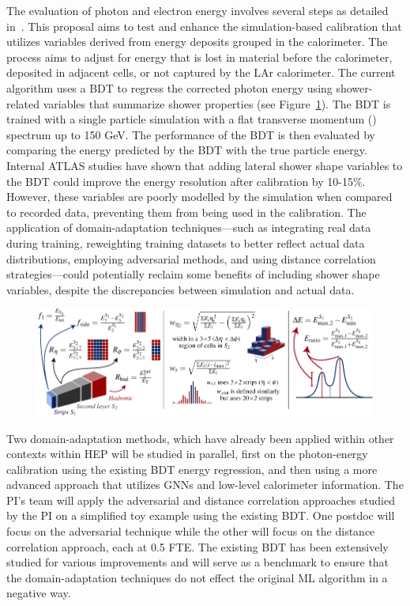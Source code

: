 \documentclass[letter, USenglish, 11pt, subfigure]{article}
\begin{document}
The evaluation of photon and electron energy involves several steps as detailed in~\cite{atlascollaboration2023electron}. This proposal aims to test and enhance the simulation-based calibration that utilizes variables derived from energy deposits grouped in the calorimeter. The process aims to adjust for energy that is lost in material before the calorimeter, deposited in adjacent cells, or not captured by the LAr calorimeter. The current algorithm uses a BDT to regress the corrected photon energy using shower-related variables that summarize shower properties (see Figure~\ref{fig:showerVars}). The BDT is trained with a single particle simulation with a flat transverse momentum (\pt) spectrum up to 150 GeV. The performance of the BDT is then evaluated by comparing the energy predicted by the BDT with the true particle energy. Internal ATLAS studies have shown that adding lateral shower shape variables to the BDT could improve the energy resolution after calibration by 10-15\%. However, these variables are poorly modelled by the simulation when compared to recorded data, preventing them from being used in the calibration. The application of domain-adaptation techniques—such as integrating real data during training, reweighting training datasets to better reflect actual data distributions, employing adversarial methods, and using distance correlation strategies—could potentially reclaim some benefits of including shower shape variables, despite the discrepancies between simulation and actual data.

\begin{figure}[ht]
  \centering
  \includegraphics[width=\textwidth]{figures/photon_ID_variables.pdf}
  \caption{\label{fig:showerVars} }
\end{figure}

Two domain-adaptation methods, which have already been applied within other contexts within HEP will be studied in parallel, first on the photon-energy calibration using the existing BDT energy regression, and then using a more advanced approach that utilizes GNNs and low-level calorimeter information. The PI's team will apply the adversarial and distance correlation approaches studied by the PI on a simplified toy example using the existing BDT. One postdoc will focus on the adversarial technique while the other will focus on the distance correlation approach, each at 0.5 FTE. The existing BDT has been extensively studied for various improvements and will serve as a benchmark to ensure that the domain-adaptation techniques do not effect the original ML algorithm in a negative way.
\end{document}

